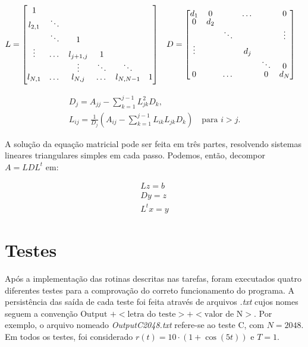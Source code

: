 \documentclass[12pt]{article}
\begin{document}
\begin{spacing}{1.5}
\begin{align}\label{matrix:ldlt}
    L =
    \renewcommand*{\arraystretch}{0.75}
    \begin{bmatrix}
    1 &&&&&\\
    l_{2,1}&\ddots &&&&\\
    &\ddots &1&&&\\
    \vdots &\dots &l_{j+1,j}&1&&\\
    &&\vdots &\ddots &\ddots &\\
    l_{N,1}&\dots &l_{N,j}&\dots &l_{N,N-1}&1
    \end{bmatrix} &&
    D =
    \renewcommand*{\arraystretch}{0.8}
    \begin{bmatrix}
    d_1 &0&&\dots&&0\\
    0& d_2 &&&&\\
    & &\ddots&&&\vdots\\
    \vdots& & & d_j &&\\
    &&&& \ddots&0\\
    0&&\dots&&0& d_{N}
    \end{bmatrix} &&
\end{align}


\begin{gather}
    D_{j}=A_{jj}-\sum _{k=1}^{j-1}L_{jk}^{2}D_{k}, \\
    L_{ij}={\frac {1}{D_{j}}}\left(A_{ij}-\sum _{k=1}^{j-1}L_{ik}L_{jk}D_{k}\right)\quad {\text{para }}i>j.
\end{gather}

A solução da equação matricial pode ser feita em três partes, resolvendo sistemas lineares triangulares simples em cada passo. Podemos, então, decompor $A = LDL^t$ em:

\setlength{\abovedisplayskip}{0.05cm}
\setlength{\belowdisplayskip}{0.2cm}
\begin{gather*}
    L z = b \\
	D y = z \\
	L^t x = y 
\end{gather*}

\section{Testes}

Após a implementação das rotinas descritas nas tarefas, foram executados quatro diferentes testes para a comprovação do correto funcionamento do programa. A persistência das saída de cada teste foi feita através de arquivos \textit{.txt} cujos nomes seguem a convenção $\text{Output } + <\text{letra do teste}> + <\text{valor de N}>$. Por exemplo, o arquivo nomeado \textit{OutputC2048.txt} refere-se ao teste C, com $N=2048$. Em todos os testes, foi considerado $r(t)=10\cdot(1+\cos(5t))$ e $T=1$.


\end{spacing}
\end{document}
